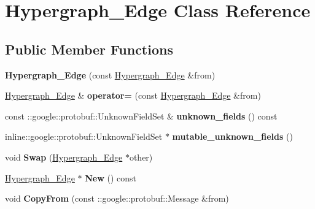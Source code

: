 \hypertarget{classHypergraph__Edge}{
\section{Hypergraph\_\-Edge Class Reference}
\label{classHypergraph__Edge}
}
\subsection*{Public Member Functions}
\begin{DoxyCompactItemize}
\item 
\hypertarget{classHypergraph__Edge_ab108838f9bbf8f03991f762393082d85}{
{\bfseries Hypergraph\_\-Edge} (const \hyperlink{classHypergraph__Edge}{Hypergraph\_\-Edge} \&from)}
\label{classHypergraph__Edge_ab108838f9bbf8f03991f762393082d85}

\item 
\hypertarget{classHypergraph__Edge_a16e449f104fcdc9762db9654f7b4ccc2}{
\hyperlink{classHypergraph__Edge}{Hypergraph\_\-Edge} \& {\bfseries operator=} (const \hyperlink{classHypergraph__Edge}{Hypergraph\_\-Edge} \&from)}
\label{classHypergraph__Edge_a16e449f104fcdc9762db9654f7b4ccc2}

\item 
\hypertarget{classHypergraph__Edge_a423eb7f720ca17f4d8f061cdeb4bff1f}{
const ::google::protobuf::UnknownFieldSet \& {\bfseries unknown\_\-fields} () const }
\label{classHypergraph__Edge_a423eb7f720ca17f4d8f061cdeb4bff1f}

\item 
\hypertarget{classHypergraph__Edge_ab421c0d9bbba2cb1f190e7f2c9e13390}{
inline::google::protobuf::UnknownFieldSet $\ast$ {\bfseries mutable\_\-unknown\_\-fields} ()}
\label{classHypergraph__Edge_ab421c0d9bbba2cb1f190e7f2c9e13390}

\item 
\hypertarget{classHypergraph__Edge_a6042bf2bb2b6a7446926d17ea1b8fe1f}{
void {\bfseries Swap} (\hyperlink{classHypergraph__Edge}{Hypergraph\_\-Edge} $\ast$other)}
\label{classHypergraph__Edge_a6042bf2bb2b6a7446926d17ea1b8fe1f}

\item 
\hypertarget{classHypergraph__Edge_a72031ccebc2408f95003ccbc9aa0dce3}{
\hyperlink{classHypergraph__Edge}{Hypergraph\_\-Edge} $\ast$ {\bfseries New} () const }
\label{classHypergraph__Edge_a72031ccebc2408f95003ccbc9aa0dce3}

\item 
\hypertarget{classHypergraph__Edge_a0f781d1a4bdef9ac8d60e93a5f7c2ec3}{
void {\bfseries CopyFrom} (const ::google::protobuf::Message \&from)}
\label{classHypergraph__Edge_a0f781d1a4bdef9ac8d60e93a5f7c2ec3}


\end{DoxyCompactItemize}

